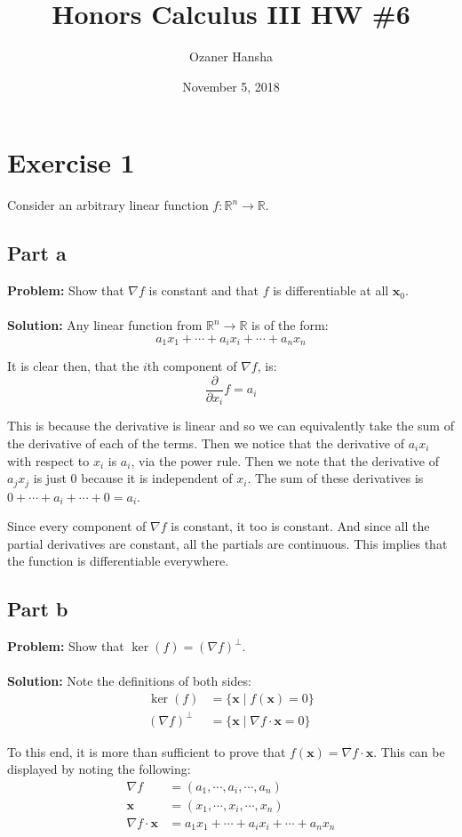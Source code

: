 \documentclass{article}
\begin{document}
\title{Honors Calculus III HW \#6}
\author{Ozaner Hansha}
\date{November 5, 2018}
\maketitle

\section*{Exercise 1}
Consider an arbitrary linear function $f:\mathbb R^n\to\mathbb R$.
\subsection*{Part a}
\textbf{Problem:} Show that $\nabla f$ is constant and that $f$ is differentiable at all $\mathbf x_0$.
\\\\
\textbf{Solution:} Any linear function from $\mathbb R^n\to\mathbb R$ is of the form:
$$a_1x_1+\cdots+a_ix_i+\cdots+a_nx_n$$

It is clear then, that the $i$th component of $\nabla f$, is:
$$\frac{\partial}{\partial x_i}f=a_i$$

This is because the derivative is linear and so we can equivalently take the sum of the derivative of each of the terms. Then we notice that the derivative of $a_ix_i$ with respect to $x_i$ is $a_i$, via the power rule. Then we note that the derivative of $a_jx_j$ is just 0 because it is independent of $x_i$. The sum of these derivatives is $0+\cdots+a_i+\cdots+0=a_i$.

Since every component of $\nabla f$ is constant, it too is constant. And since all the partial derivatives are constant, all the partials are continuous. This implies that the function is differentiable everywhere.

\subsection*{Part b}
\textbf{Problem:} Show that $\operatorname{ker}(f)=(\nabla f)^\perp$.
\\\\
\textbf{Solution:} Note the definitions of both sides:
\begin{align*}
  \operatorname{ker}(f)&=\{\mathbf x\mid f(\mathbf x)=0\}\\
  (\nabla f)^\perp&=\{\mathbf x\mid \nabla f\cdot\mathbf x=0\}
\end{align*}

To this end, it is more than sufficient to prove that $f(\mathbf x)=\nabla f\cdot\mathbf x$. This can be displayed by noting the following:
$$\begin{align*}
  \nabla f&=(a_1,\cdots,a_i,\cdots,a_n)\\
  \mathbf x &= (x_1,\cdots,x_i,\cdots,x_n)\\
  \nabla f\cdot\mathbf x&=a_1x_1+\cdots+a_ix_i+\cdots+a_nx_n\\
\end{align*}$$
\end{document}
